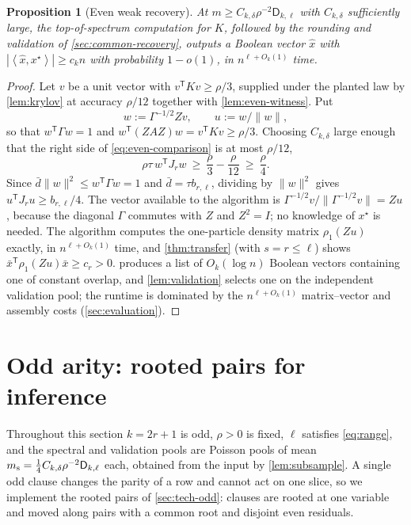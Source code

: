 \documentclass[11pt]{article}
\newtheorem{proposition}[proposition]{Proposition}
\theoremstyle{definition}
\theoremstyle{remark}
\newcommand{\1}{\mathbf 1}
\newcommand{\bd}{\bar d}
\newcommand{\Dkl}{\mathsf D_{k,\ell}}
\newcommand{\xstar}{{x^\star}}
\newcommand{\rhoone}{\rho_1}
\newcommand{\ip}[2]{\left\langle #1,#2\right\rangle}
\numberwithin{equation}{section}
\begin{document}
\begin{proposition}[Even weak recovery]\label{prop:even-recovery}
At $m\ge C_{k,\delta}\rho^{-2}\Dkl$ with $C_{k,\delta}$ sufficiently
large, the top-of-spectrum computation for $K$, followed by the rounding
and validation of \cref{sec:common-recovery}, outputs a Boolean vector
$\widehat x$ with $|\ip{\widehat x}{\xstar}|\ge c_kn$ with probability
$1-o(1)$, in $n^{\ell+O_k(1)}$ time.
\end{proposition}
\begin{proof}
Let $v$ be a unit vector with $v^{\mathsf T}Kv\ge\rho/3$, supplied under
the planted law by \cref{lem:krylov} at accuracy $\rho/12$ together with
\cref{lem:even-witness}.  Put
\[
 w:=\Gamma^{-1/2}Zv,\qquad u:=w/\|w\|,
\]
so that $w^{\mathsf T}\Gamma w=1$ and
$w^{\mathsf T}(ZAZ)w=v^{\mathsf T}Kv\ge\rho/3$.  Choosing
$C_{k,\delta}$ large enough that the right side of
\cref{eq:even-comparison} is at most $\rho/12$,
\[
 \rho\tau\,w^{\mathsf T}J_rw\ \ge\ \frac\rho3-\frac\rho{12}
 \ \ge\ \frac\rho4 .
\]
Since $\bd\|w\|^2\le w^{\mathsf T}\Gamma w=1$ and $\bd=\tau b_{r,\ell}$,
dividing by $\|w\|^2$ gives
$u^{\mathsf T}J_ru\ge b_{r,\ell}/4$.  The vector available to the
algorithm is $\Gamma^{-1/2}v/\|\Gamma^{-1/2}v\|=Zu$, because the
diagonal $\Gamma$ commutes with $Z$ and $Z^2=I$; no knowledge of
$\xstar$ is needed.  The algorithm computes the one-particle density
matrix $\rhoone(Zu)$ exactly, in $n^{\ell+O_k(1)}$ time, and
\cref{thm:transfer} (with $s=r\le\ell$) shows
$\bar x^{\mathsf T}\rhoone(Zu)\bar x\ge c_{r}>0$.
 produces a list of $O_k(\log n)$ Boolean vectors
containing one of constant overlap, and \cref{lem:validation} selects
one on the independent validation pool; the runtime is dominated by the
$n^{\ell+O_k(1)}$ matrix--vector and assembly costs
(\cref{sec:evaluation}).
\end{proof}

\section{Odd arity: rooted pairs for inference}\label{sec:odd}

Throughout this section $k=2r+1$ is odd, $\rho>0$ is fixed, $\ell$
satisfies \cref{eq:range}, and the spectral and validation pools are
Poisson pools of mean
$m_{\rm s}=\tfrac14C_{k,\delta}\rho^{-2}\Dkl$ each, obtained from the
input by \cref{lem:subsample}.  A single odd clause changes the parity
of a row and cannot act on one slice, so we implement the rooted pairs
of \cref{sec:tech-odd}: clauses are rooted at one variable and moved
along pairs with a common root and disjoint even residuals.
\end{document}
